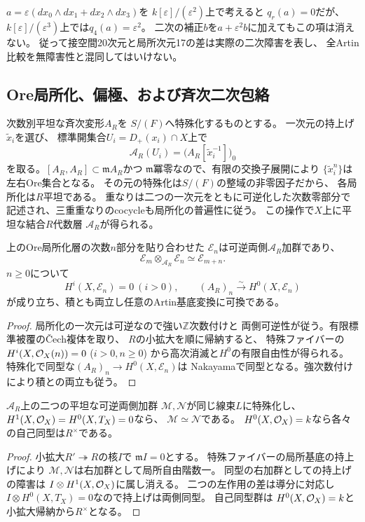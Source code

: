 \begin{remark}[一次方向はすべて二次へ延長するわけではない]
\label{rem:artin-obstruction}
$a=\varepsilon(dx_0\wedge dx_1+dx_2\wedge dx_3)$を
$k[\varepsilon]/(\varepsilon^2)$上で考えると
$q_r(a)=0$だが、
$k[\varepsilon]/(\varepsilon^3)$上では$q_4(a)=\varepsilon^2$。
二次の補正$b$を$a+\varepsilon^2b$に加えてもこの項は消えない。
従って接空間20次元と局所次元17の差は実際の二次障害を表し、
全Artin比較を無障害性と混同してはいけない。
\end{remark}

\subsection{Ore局所化、偏極、および斉次二次包絡}
次数別平坦な斉次変形$A_R$を
$S/(F)$へ特殊化するものとする。
一次元の持上げ$\widetilde x_i$を選び、
標準開集合$U_i=D_+(x_i)\cap X$上で
\[
 \mathscr A_R(U_i)=
 \bigl(A_R[\widetilde x_i^{-1}]\bigr)_0
\]
を取る。$[A_R,A_R]\subset\mathfrak m A_R$かつ
$\mathfrak m$冪零なので、有限の交換子展開により
$\{\widetilde x_i^n\}$は左右Ore集合となる。
その元の特殊化は$S/(F)$の整域の非零因子だから、
各局所化は$R$平坦である。
重なりは二つの一次元をともに可逆化した次数零部分で
記述され、三重重なりのcocycleも局所化の普遍性に従う。
この操作で$X$上に平坦な結合$R$代数層
$\mathscr A_R$が得られる。

\begin{proposition}
\label{prop:artin-ore-section}
上のOre局所化層の次数$n$部分を貼り合わせた
$\mathscr E_n$は可逆両側$\mathscr A_R$加群であり、
\[
 \mathscr E_m\otimes_{\mathscr A_R}\mathscr E_n
 \simeq\mathscr E_{m+n}.
\]
$n\ge0$について
\[
 H^i(X,\mathscr E_n)=0\ (i>0),\qquad
 (A_R)_n\xrightarrow{\sim}H^0(X,\mathscr E_n)
\]
が成り立ち、積とも両立し任意のArtin基底変換に可換である。
\end{proposition}
\begin{proof}
局所化の一次元は可逆なので強い$\mathbb Z$次数付けと
両側可逆性が従う。有限標準被覆の\v{C}ech複体を取り、
$R$の小拡大を順に帰納すると、
特殊ファイバーの$H^i(X,\mathcal O_X(n))=0$ ($i>0,n\ge0$)
から高次消滅と$H^0$の有限自由性が得られる。
特殊化で同型な$(A_R)_n\to H^0(X,\mathscr E_n)$は
Nakayamaで同型となる。強次数付けにより積との両立も従う。
\end{proof}

\begin{lemma}[可逆両側偏極の同型類の一意性]
\label{lem:artin-polarization}
$\mathscr A_R$上の二つの平坦な可逆両側加群
$\mathscr M,\mathscr N$が同じ線束$L$に特殊化し、
$H^1(X,\mathcal O_X)=H^0(X,T_X)=0$なら、
$\mathscr M\simeq\mathscr N$である。
$H^0(X,\mathcal O_X)=k$なら各々の自己同型は$R^\times$である。
\end{lemma}
\begin{proof}
小拡大$R'\twoheadrightarrow R$の核$I$で
$\mathfrak mI=0$とする。
特殊ファイバーの局所基底の持上げにより
$\mathscr M,\mathscr N$は右加群として局所自由階数一。
同型の右加群としての持上げの障害は
$I\otimes H^1(X,\mathcal O_X)$に属し消える。
二つの左作用の差は導分に対応し
$I\otimes H^0(X,T_X)=0$なので持上げは両側同型。
自己同型群は
$H^0(X,\mathcal O_X)=k$と小拡大帰納から$R^\times$となる。
\end{proof}

